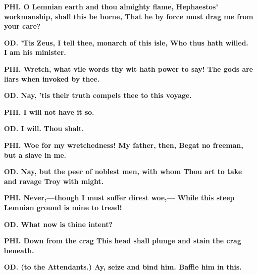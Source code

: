 \documentclass[11pt,letter]{book}
\begin{document}
\par \textbf{PHI. O Lemnian earth and thou almighty flame, Hephaestos’ workmanship, shall this be borne, That he by force must drag me from your care?}
\par 

\par \textbf{OD. ’Tis Zeus, I tell thee, monarch of this isle, Who thus hath willed. I am his minister.}
\par 

\par \textbf{PHI. Wretch, what vile words thy wit hath power to say! The gods are liars when invoked by thee.}
\par 

\par \textbf{OD. Nay, ’tis their truth compels thee to this voyage.}
\par 

\par \textbf{PHI. I will not have it so.}
\par 

\par \textbf{OD. I will. Thou shalt.}
\par 

\par \textbf{PHI. Woe for my wretchedness! My father, then, Begat no freeman, but a slave in me.}
\par 

\par \textbf{OD. Nay, but the peer of noblest men, with whom Thou art to take and ravage Troy with might.}
\par 

\par \textbf{PHI. Never,—though I must suffer direst woe,— While this steep Lemnian ground is mine to tread!}
\par 

\par \textbf{OD. What now is thine intent?}
\par 

\par \textbf{PHI. Down from the crag This head shall plunge and stain the crag beneath.}
\par 

\par \textbf{OD. (to the Attendants.) Ay, seize and bind him. Baffle him in this.}
\par 
\end{document}
